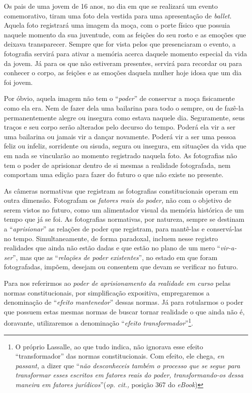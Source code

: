 Os pais de uma jovem de 16 anos, no dia em que se realizará um evento
comemorativo, tiram uma foto dela vestida para uma apresentação de
\emph{ballet}. Aquela foto registrará uma imagem da moça, com o porte
físico que possuia naquele momento da sua juventude, com as feições do
seu rosto e as emoções que deixava transparecer. Sempre que for vista
pelos que presenciaram o evento, a fotografia servirá para ativar a
memória acerca daquele momento especial da vida da jovem. Já para os que
não estiveram presentes, servirá para recordar ou para conhecer o corpo,
as feições e as emoções daquela mulher hoje idosa que um dia foi jovem.

Por óbvio, aquela imagem não tem o ``\emph{poder}'' de conservar a moça
fisicamente como ela era. Nem de fazer dela uma bailarina para todo o
sempre, ou de fazê-la permanentemente alegre ou insegura como estava
naquele dia. Seguramente, seus traços e seu corpo serão alterados pelo
decurso do tempo. Poderá ela vir a ser uma bailarina ou jamais vir a
dançar novamente. Poderá vir a ser uma pessoa feliz ou infeliz,
sorridente ou sisuda, segura ou insegura, em situações da vida que em
nada se vincularão ao momento registrado naquela foto. As fotografias
não tem o poder de aprisionar dentro de si mesmas a realidade
fotografada, nem comportam uma edição para fazer do futuro o que não
existe no presente.

As câmeras normativas que registram as fotografias constitucionais
operam em outra dimensão. Fotografam os \emph{fatores reais do poder,}
não com o objetivo de serem vistos no futuro, como um alimentador visual
da memória histórica de um tempo que já se foi. As fotografias
normativas, por natureza, sempre se destinam a ``\emph{aprisionar}'' as
relações de poder que registram, para mantê-las e conservá-las no tempo.
Simultaneamente, de forma paradoxal, incluem nesse registro realidades
que ainda não estão dadas e que estão no plano de um mero
``\emph{vir-a-ser}'', mas que as ``\emph{relações de poder}
\emph{existentes}'', no estado em que foram fotografadas, impõem,
desejam ou consentem que devam se verificar no futuro.

Para nos referirmos ao \emph{poder de aprisionamento da realidade em
curso} pelas normas constitucionais, por simplificação expositiva,
empregaremos a denominação de ``\emph{efeito mantenedor}'' dessas
normas. Já para rotularmos o poder que possuem estas mesmas normas de
buscar tornar realidade o que ainda não é, doravante, utilizaremos a
denominação ``\emph{efeito transformador}''\footnote{O próprio Lassalle,
  ao que tudo indica, não ignorava esse efeito ``transformador'' das
  normas constitucionais. Com efeito, ele chega, \emph{en passant,} a
  dizer que ``\emph{não desconheceis também o processo que se segue para
  transformar esses escritos em fatores reais do poder, transformando-os
  dessa maneira em fatores jurídicos}''(\emph{op. cit.,} posição 367 do
  \emph{eBook})}.

